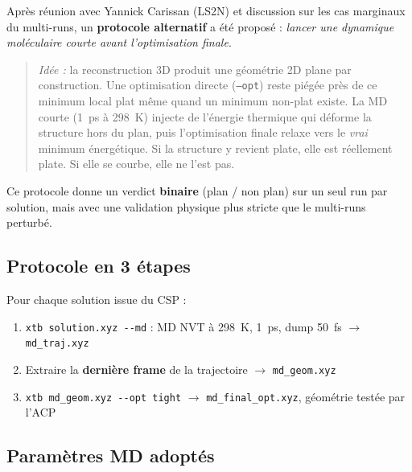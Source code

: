 Après réunion avec Yannick Carissan (LS2N) et discussion sur les cas marginaux du
multi-runs, un \textbf{protocole alternatif} a été proposé :
\textit{lancer une dynamique moléculaire courte avant l'optimisation finale}.

\begin{quote}
\textit{Idée :} la reconstruction 3D produit une géométrie 2D plane par construction.
Une optimisation directe (\texttt{--opt}) reste piégée près de ce minimum local plat
même quand un minimum non-plat existe. La MD courte (1~ps à 298~K) injecte de
l'énergie thermique qui déforme la structure hors du plan, puis l'optimisation finale
relaxe vers le \emph{vrai} minimum énergétique. Si la structure y revient plate, elle est
réellement plate. Si elle se courbe, elle ne l'est pas.
\end{quote}

Ce protocole donne un verdict \textbf{binaire} (plan / non plan) sur un seul run par solution,
mais avec une validation physique plus stricte que le multi-runs perturbé.

\subsection{Protocole en 3 étapes}

Pour chaque solution issue du CSP :

\begin{enumerate}
  \item \texttt{xtb solution.xyz -{}-md} : MD NVT à 298~K, 1~ps, dump 50~fs $\to$ \texttt{md\_traj.xyz}
  \item Extraire la \textbf{dernière frame} de la trajectoire $\to$ \texttt{md\_geom.xyz}
  \item \texttt{xtb md\_geom.xyz -{}-opt tight} $\to$ \texttt{md\_final\_opt.xyz}, géométrie testée par l'ACP
\end{enumerate}

\subsection{Paramètres MD adoptés}

